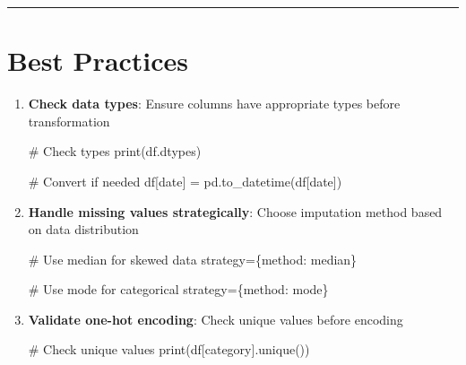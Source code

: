\documentclass[
  letterpaper,
]{scrbook}
\newenvironment{Shaded}{\begin{snugshade}}{\end{snugshade}}
\newcommand{\BuiltInTok}[1]{\textcolor[rgb]{0.00,0.23,0.31}{#1}}
\newcommand{\CommentTok}[1]{\textcolor[rgb]{0.37,0.37,0.37}{#1}}
\newcommand{\NormalTok}[1]{\textcolor[rgb]{0.00,0.23,0.31}{#1}}
\newcommand{\OperatorTok}[1]{\textcolor[rgb]{0.37,0.37,0.37}{#1}}
\newcommand{\StringTok}[1]{\textcolor[rgb]{0.13,0.47,0.30}{#1}}
\begin{document}
\begin{center}\rule{0.5\linewidth}{0.5pt}\end{center}

\section{Best Practices}\label{best-practices-3}

\begin{enumerate}
\def\labelenumi{\arabic{enumi}.}
\item
  \textbf{Check data types}: Ensure columns have appropriate types
  before transformation

\begin{Shaded}
\begin{Highlighting}[]
\CommentTok{\# Check types}
\BuiltInTok{print}\NormalTok{(df.dtypes)}

\CommentTok{\# Convert if needed}
\NormalTok{df[}\StringTok{\textquotesingle{}date\textquotesingle{}}\NormalTok{] }\OperatorTok{=}\NormalTok{ pd.to\_datetime(df[}\StringTok{\textquotesingle{}date\textquotesingle{}}\NormalTok{])}
\end{Highlighting}
\end{Shaded}
\item
  \textbf{Handle missing values strategically}: Choose imputation method
  based on data distribution

\begin{Shaded}
\begin{Highlighting}[]
\CommentTok{\# Use median for skewed data}
\NormalTok{strategy}\OperatorTok{=}\NormalTok{\{}\StringTok{\textquotesingle{}method\textquotesingle{}}\NormalTok{: }\StringTok{\textquotesingle{}median\textquotesingle{}}\NormalTok{\}}

\CommentTok{\# Use mode for categorical}
\NormalTok{strategy}\OperatorTok{=}\NormalTok{\{}\StringTok{\textquotesingle{}method\textquotesingle{}}\NormalTok{: }\StringTok{\textquotesingle{}mode\textquotesingle{}}\NormalTok{\}}
\end{Highlighting}
\end{Shaded}
\item
  \textbf{Validate one-hot encoding}: Check unique values before
  encoding

\begin{Shaded}
\begin{Highlighting}[]
\CommentTok{\# Check unique values}
\BuiltInTok{print}\NormalTok{(df[}\StringTok{\textquotesingle{}category\textquotesingle{}}\NormalTok{].unique())}


\end{Highlighting}
\end{Shaded}
\end{enumerate}
\end{document}
